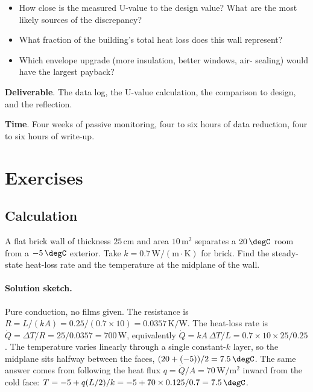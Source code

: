 \begin{project}
\begin{itemize}[leftmargin=*]
  \item How close is the measured U-value to the design value? What
    are the most likely sources of the discrepancy?
  \item What fraction of the building's total heat loss does this
    wall represent?
  \item Which envelope upgrade (more insulation, better windows, air-
    sealing) would have the largest payback?
\end{itemize}

\textbf{Deliverable}. The data log, the U-value calculation, the
comparison to design, and the reflection.

\textbf{Time}. Four weeks of passive monitoring, four to six hours of
data reduction, four to six hours of write-up.
\end{project}

\section{Exercises}

\subsection*{Calculation}

\begin{exercise}
A flat brick wall of thickness $25\,\si{\centi\meter}$ and area
$10\,\text{m}^2$ separates a $20\,\degC$ room from a $-5\,\degC$
exterior. Take $k = 0.7\,\text{W}/(\text{m}\cdot\si{\kelvin})$ for
brick. Find the steady-state heat-loss rate and the temperature at
the midplane of the wall.
\paragraph{Solution sketch.} Pure conduction, no films given. The
resistance is $R = L/(kA) = 0.25/(0.7 \times 10) = 0.0357\,\si{\kelvin}
/\text{W}$. The heat-loss rate is $\dot{Q} = \Delta T/R = 25/0.0357 =
700\,\text{W}$, equivalently $\dot{Q} = kA\,\Delta T/L = 0.7 \times 10
\times 25/0.25$. The temperature varies linearly through a single
constant-$k$ layer, so the midplane sits halfway between the faces,
$(20 + (-5))/2 = 7.5\,\degC$. The same answer comes from following the
heat flux $q = \dot{Q}/A = 70\,\text{W}/\text{m}^2$ inward from the
cold face: $T = -5 + q(L/2)/k = -5 + 70 \times 0.125/0.7 = 7.5\,\degC$.
\end{exercise}

